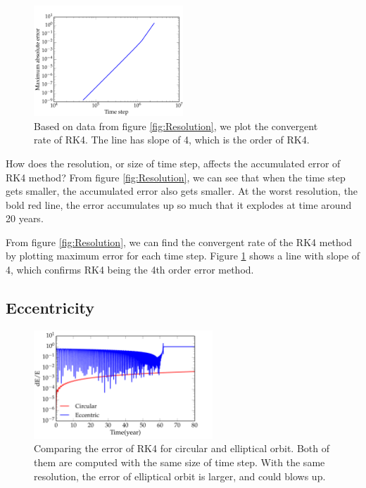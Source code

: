 \documentclass[11pt,letterpaper]{article}
\begin{document}
\begin{figure}[h!]
	\centering
	\includegraphics[width=0.5\textwidth]{Convergence}
	\caption{Based on data from figure \ref{fig:Resolution}, we plot the convergent rate of RK4. The line has slope of 4, which is the order of RK4.}
	\label{fig:Convergence}
\end{figure}

How does the resolution, or size of time step, affects the accumulated error of RK4 method? From figure \ref{fig:Resolution}, we can see that when the time step gets smaller, the accumulated error also gets smaller. At the worst resolution, the bold red line, the error accumulates up so much that it explodes at time around 20 years.

From figure \ref{fig:Resolution}, we can find the convergent rate of the RK4 method by plotting maximum error for each time step. Figure \ref{fig:Convergence} shows a line with slope of 4, which confirms RK4 being the 4th order error method.

\subsection{Eccentricity}

\begin{figure}[h!]
	\centering
	\includegraphics[width = 0.6\textwidth]{Eccentric_Error}
	\caption{Comparing the error of RK4 for circular and elliptical orbit. Both of them are computed with the same size of time step. With the same resolution, the error of elliptical orbit is larger, and could blows up.}
	\label{fig:Eccentric_Error}
\end{figure}
	
\end{document}
